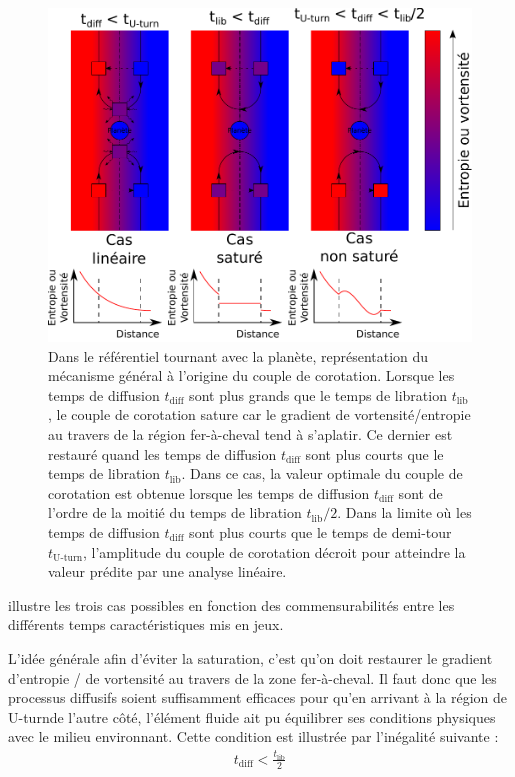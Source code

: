 \begin{figure}[htbp]
\centering
\includegraphics[width=0.75\linewidth]{figure/corotation_principle.pdf}
\caption[État du couple de corotation en fonction des valeurs des temps caractéristiques.]{Dans le référentiel tournant avec la
planète, représentation du mécanisme général à l'origine du couple de corotation. Lorsque les temps de diffusion $t_\text{diff}$
sont plus grands que le temps de libration $t_\text{lib}$, le couple de corotation sature car le gradient de vortensité/entropie
au travers de la région fer-à-cheval tend à s'aplatir. Ce dernier est restauré quand les temps de diffusion $t_\text{diff}$ sont
plus courts que le temps de libration $t_\text{lib}$. Dans ce cas, la valeur optimale du couple de corotation est obtenue
lorsque les temps de diffusion $t_\text{diff}$ sont de l'ordre de la moitié du temps de libration $t_\text{lib}/2$. Dans la
limite où les temps de diffusion $t_\text{diff}$ sont plus courts que le temps de demi-tour $t_\text{U-turn}$, l'amplitude du
couple de corotation décroit pour atteindre la valeur prédite par une analyse linéaire.}\label{fig:corotation_principle}
\end{figure}

 illustre les trois cas possibles en fonction des commensurabilités entre les différents temps caractéristiques mis en jeux.

L'idée générale afin d'éviter la saturation, c'est qu'on doit restaurer le gradient d'entropie / de vortensité au travers de la
zone fer-à-cheval. Il faut donc que les processus diffusifs soient suffisamment efficaces pour qu'en arrivant à la région de \og
U-turn\fg de l'autre côté, l'élément fluide ait pu équilibrer ses conditions physiques avec le milieu environnant. Cette
condition est illustrée par l'inégalité suivante : 
\begin{align}
t_\text{diff} < \frac{t_\text{lib}}{2}
\end{align}

